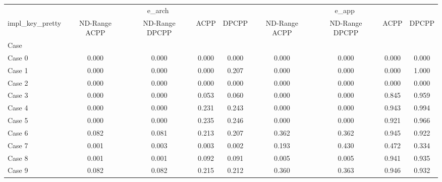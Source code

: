\begin{tabular}{lcccccccc}
\toprule
 & \multicolumn{4}{c}{e_arch} & \multicolumn{4}{c}{e_app} \\
impl_key_pretty & ND-Range ACPP & ND-Range DPCPP & ACPP & DPCPP & ND-Range ACPP & ND-Range DPCPP & ACPP & DPCPP \\
Case &  &  &  &  &  &  &  &  \\
\midrule
Case 0 & 0.000 & 0.000 & 0.000 & 0.000 & 0.000 & 0.000 & 0.000 & 0.000 \\
Case 1 & 0.000 & 0.000 & 0.000 & \cellcolor{green!25}0.207 & 0.000 & 0.000 & 0.000 & \cellcolor{green!25}1.000 \\
Case 2 & 0.000 & 0.000 & 0.000 & 0.000 & 0.000 & 0.000 & 0.000 & 0.000 \\
Case 3 & 0.000 & 0.000 & 0.053 & \cellcolor{green!25}0.060 & 0.000 & 0.000 & 0.845 & \cellcolor{green!25}0.959 \\
Case 4 & 0.000 & 0.000 & 0.231 & \cellcolor{green!25}0.243 & 0.000 & 0.000 & 0.943 & \cellcolor{green!25}0.994 \\
Case 5 & 0.000 & 0.000 & 0.235 & \cellcolor{green!25}0.246 & 0.000 & 0.000 & 0.921 & \cellcolor{green!25}0.966 \\
Case 6 & 0.082 & 0.081 & \cellcolor{green!25}0.213 & 0.207 & 0.362 & 0.362 & \cellcolor{green!25}0.945 & 0.922 \\
Case 7 & 0.001 & 0.003 & \cellcolor{green!25}0.003 & 0.002 & 0.193 & 0.430 & \cellcolor{green!25}0.472 & 0.334 \\
Case 8 & 0.001 & 0.001 & \cellcolor{green!25}0.092 & 0.091 & 0.005 & 0.005 & \cellcolor{green!25}0.941 & 0.935 \\
Case 9 & 0.082 & 0.082 & \cellcolor{green!25}0.215 & 0.212 & 0.360 & 0.363 & \cellcolor{green!25}0.946 & 0.932 \\
\bottomrule
\end{tabular}
